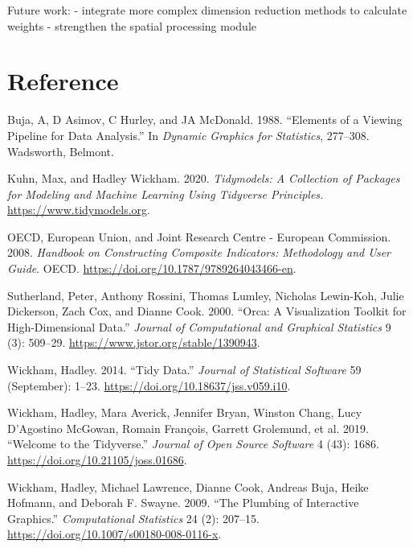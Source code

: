 \documentclass[
]{interact}
\newlength{\cslhangindent}
\newlength{\cslentryspacingunit} %
\newenvironment{CSLReferences}[2] %
 {%
  \setlength{\parindent}{0pt}
  \ifodd #1
  \let\oldpar\par
  \def\par{\hangindent=\cslhangindent\oldpar}
  \fi
  \setlength{\parskip}{#2\cslentryspacingunit}
 }%
 {}
\begin{document}
Future work: - integrate more complex dimension reduction methods to
calculate weights - strengthen the spatial processing module

\hypertarget{reference}{%
\section*{Reference}\label{reference}}

\hypertarget{refs}{}
\begin{CSLReferences}{1}{0}
\leavevmode{}%
Buja, A, D Asimov, C Hurley, and JA McDonald. 1988. {``Elements of a
Viewing Pipeline for Data Analysis.''} In \emph{Dynamic Graphics for
Statistics}, 277--308. Wadsworth, Belmont.

\leavevmode{}%
Kuhn, Max, and Hadley Wickham. 2020. \emph{Tidymodels: A Collection of
Packages for Modeling and Machine Learning Using Tidyverse Principles.}
\url{https://www.tidymodels.org}.

\leavevmode{}%
OECD, European Union, and Joint Research Centre - European Commission.
2008. \emph{Handbook on {Constructing} {Composite} {Indicators}:
{Methodology} and {User} {Guide}}. OECD.
\url{https://doi.org/10.1787/9789264043466-en}.

\leavevmode{}%
Sutherland, Peter, Anthony Rossini, Thomas Lumley, Nicholas Lewin-Koh,
Julie Dickerson, Zach Cox, and Dianne Cook. 2000. {``Orca: {A}
{Visualization} {Toolkit} for {High}-{Dimensional} {Data}.''}
\emph{Journal of Computational and Graphical Statistics} 9 (3): 509--29.
\url{https://www.jstor.org/stable/1390943}.

\leavevmode{}%
Wickham, Hadley. 2014. {``Tidy {Data}.''} \emph{Journal of Statistical
Software} 59 (September): 1--23.
\url{https://doi.org/10.18637/jss.v059.i10}.

\leavevmode{}%
Wickham, Hadley, Mara Averick, Jennifer Bryan, Winston Chang, Lucy
D'Agostino McGowan, Romain François, Garrett Grolemund, et al. 2019.
{``Welcome to the {Tidyverse}.''} \emph{Journal of Open Source Software}
4 (43): 1686. \url{https://doi.org/10.21105/joss.01686}.

\leavevmode{}%
Wickham, Hadley, Michael Lawrence, Dianne Cook, Andreas Buja, Heike
Hofmann, and Deborah F. Swayne. 2009. {``The Plumbing of Interactive
Graphics.''} \emph{Computational Statistics} 24 (2): 207--15.
\url{https://doi.org/10.1007/s00180-008-0116-x}.


\end{CSLReferences}
\end{document}
